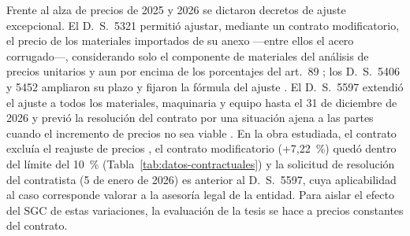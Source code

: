 Frente al alza de precios de 2025 y 2026 se dictaron decretos de ajuste excepcional. El D.~S.~5321 permitió ajustar, mediante un contrato modificatorio, el precio de los materiales importados de su anexo ---entre ellos el acero corrugado---, considerando solo el componente de materiales del análisis de precios unitarios y aun por encima de los porcentajes del art.~89 \parencite[arts.~3--4 y anexo]{ds5321_2025}; los D.~S.~5406 y 5452 ampliaron su plazo y fijaron la fórmula del ajuste \parencite{ds5406_2025,ds5452_2025}. El D.~S.~5597 extendió el ajuste a todos los materiales, maquinaria y equipo hasta el 31 de diciembre de 2026 y previó la resolución del contrato por una situación ajena a las partes cuando el incremento de precios no sea viable \parencite[art.~4 y disposición adicional quinta]{ds5597_2026}. En la obra estudiada, el contrato excluía el reajuste de precios \parencite[p.~95]{uatf2025pao2}, el contrato modificatorio (+7,22~\%) quedó dentro del límite del 10~\% (Tabla~\ref{tab:datos-contractuales}) y la solicitud de resolución del contratista (5 de enero de 2026) es anterior al D.~S.~5597, cuya aplicabilidad al caso corresponde valorar a la asesoría legal de la entidad. Para aislar el efecto del SGC de estas variaciones, la evaluación de la tesis se hace a precios constantes del contrato.

